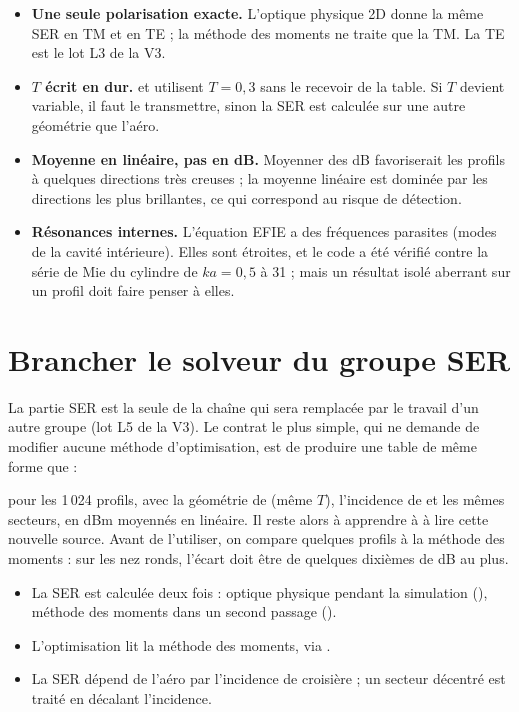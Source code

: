 \begin{piege}
\begin{itemize}
\item \textbf{Une seule polarisation exacte.} L'optique physique 2D donne la même SER en TM et en TE ; la méthode des moments ne traite que la TM. La TE est le lot L3 de la V3.
\item \textbf{$T$ écrit en dur.}  et  utilisent $T=0{,}3$ sans le recevoir de la table. Si $T$ devient variable, il faut le transmettre, sinon la SER est calculée sur une autre géométrie que l'aéro.
\item \textbf{Moyenne en linéaire, pas en dB.} Moyenner des dB favoriserait les profils à quelques directions très creuses ; la moyenne linéaire est dominée par les directions les plus brillantes, ce qui correspond au risque de détection.
\item \textbf{Résonances internes.} L'équation EFIE a des fréquences parasites (modes de la cavité intérieure). Elles sont étroites, et le code a été vérifié contre la série de Mie du cylindre de $ka=0{,}5$ à 31 ; mais un résultat isolé aberrant sur un profil doit faire penser à elles.
\end{itemize}
\end{piege}

\section{Brancher le solveur du groupe SER}
La partie SER est la seule de la chaîne qui sera remplacée par le travail d'un autre groupe (lot L5 de la V3). Le contrat le plus simple, qui ne demande de modifier aucune méthode d'optimisation, est de produire une table de même forme que  :
\begin{center}
\end{center}
pour les 1\,024 profils, avec la géométrie de  (même $T$), l'incidence  de  et les mêmes secteurs, en dBm moyennés en linéaire. Il reste alors à apprendre à  à lire cette nouvelle source. Avant de l'utiliser, on compare quelques profils à la méthode des moments : sur les nez ronds, l'écart doit être de quelques dixièmes de dB au plus.

\begin{resultat}
\begin{itemize}
\item La SER est calculée deux fois : optique physique pendant la simulation (), méthode des moments dans un second passage ().
\item L'optimisation lit la méthode des moments, via .
\item La SER dépend de l'aéro par l'incidence de croisière ; un secteur décentré est traité en décalant l'incidence.
\end{itemize}
\end{resultat}

